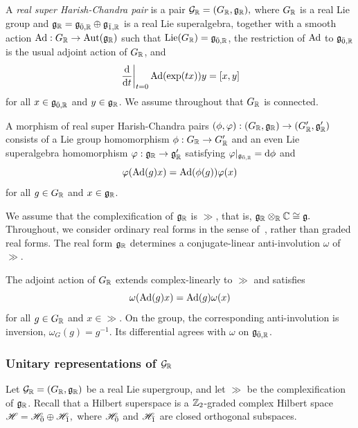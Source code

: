 A \emph{real super Harish-Chandra pair} is a pair
$
{\mathcal{G}}_{{\mathbb R}}=(G_{{\mathbb R}},{\mathfrak{g}}_{{\mathbb R}}),
$
where $G_{{\mathbb R}}$ is a real Lie group and ${\mathfrak{g}}_{{\mathbb R}}={\mathfrak{g}}_{\bar0,{\mathbb R}}\oplus{\mathfrak{g}}_{\bar1,{\mathbb R}}$ is a real Lie superalgebra, together with a smooth action
$
\operatorname{Ad}:G_{{\mathbb R}}\to\operatorname{Aut}({\mathfrak{g}}_{{\mathbb R}})
$
such that $\operatorname{Lie}(G_{{\mathbb R}})={\mathfrak{g}}_{\bar0,{\mathbb R}}$, the restriction of $\operatorname{Ad}$ to ${\mathfrak{g}}_{\bar0,{\mathbb R}}$ is the usual adjoint action of $G_{{\mathbb R}}$, and
\begin{equation}
\left.\frac{\mathrm d}{\mathrm dt}\right|_{t=0}
\operatorname{Ad}(\exp(tx))y
=
[x,y]
\end{equation}
for all $x\in{\mathfrak{g}}_{\bar0,{\mathbb R}}$ and $y\in{\mathfrak{g}}_{{\mathbb R}}$. We assume throughout that $G_{{\mathbb R}}$ is connected.

A morphism of real super Harish-Chandra pairs
$
(\phi,\varphi):(G_{{\mathbb R}},{\mathfrak{g}}_{{\mathbb R}})\to(G'_{{\mathbb R}},{\mathfrak{g}}'_{{\mathbb R}})
$
consists of a Lie group homomorphism $\phi:G_{{\mathbb R}}\to G'_{{\mathbb R}}$ and an even Lie superalgebra homomorphism $\varphi:{\mathfrak{g}}_{{\mathbb R}}\to{\mathfrak{g}}'_{{\mathbb R}}$ satisfying
$
\varphi|_{{\mathfrak{g}}_{\bar0,{\mathbb R}}}=\mathrm d\phi
$
and
\begin{equation}
\varphi(\operatorname{Ad}(g)x)=\operatorname{Ad}(\phi(g))\varphi(x)
\end{equation}
for all $g\in G_{{\mathbb R}}$ and $x\in{\mathfrak{g}}_{{\mathbb R}}$.

We assume that the complexification of ${\mathfrak{g}}_{{\mathbb R}}$ is $\gg$, that is,
$
{\mathfrak{g}}_{{\mathbb R}}\otimes_{{\mathbb R}}{\mathbb C}\cong{\mathfrak{g}}.
$
Throughout, we consider ordinary real forms in the sense of~\cite{FioresiGavariniRealForms}, rather than graded real forms. The real form ${\mathfrak{g}}_{{\mathbb R}}$ determines a conjugate-linear anti-involution $\omega$ of $\gg$.

The adjoint action of $G_{{\mathbb R}}$ extends complex-linearly to $\gg$ and satisfies
\begin{equation}
\omega(\operatorname{Ad}(g)x)=\operatorname{Ad}(g)\omega(x)
\end{equation}
for all $g\in G_{{\mathbb R}}$ and $x\in\gg$. On the group, the corresponding anti-involution is inversion,
$
\omega_G(g)=g^{-1}.
$
Its differential agrees with $\omega$ on ${\mathfrak{g}}_{\bar0,{\mathbb R}}$.

\subsubsection{Unitary representations of \texorpdfstring{${\mathcal{G}}_{{\mathbb R}}$}{G}}

Let ${\mathcal{G}}_{{\mathbb R}}=(G_{{\mathbb R}},{\mathfrak{g}}_{{\mathbb R}})$ be a real Lie supergroup, and let $\gg$ be the complexification of ${\mathfrak{g}}_{{\mathbb R}}$. Recall that a Hilbert superspace is a ${\mathbb Z}_2$-graded complex Hilbert space
$
{\mathscr{H}}={\mathscr{H}}_{\bar0}\oplus{\mathscr{H}}_{\bar1},
$
where ${\mathscr{H}}_{\bar0}$ and ${\mathscr{H}}_{\bar1}$ are closed orthogonal subspaces. 


